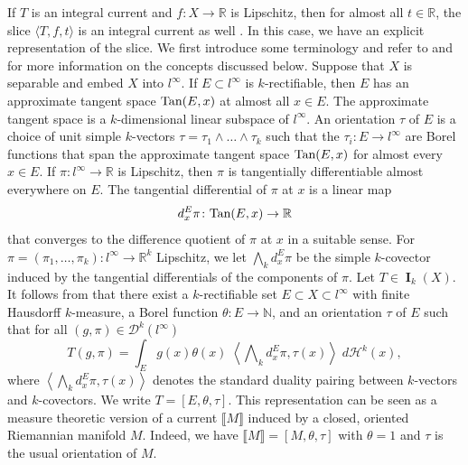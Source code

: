 \documentclass{amsart}
\numberwithin{equation}{section}
\newcommand{\R}{\mathbb{R}}
\newcommand{\N}{\mathbb{N}}
\newcommand{\Ha}{\mathcal{H}}
\newcommand{\on}{\:\mbox{\rule{0.1ex}{1.2ex}\rule{1.1ex}{0.1ex}}\:}
\DeclareMathOperator{\bI}{\mathbf{I}}
\newcommand{\bb}[1]{\llbracket #1\rrbracket}
\begin{document}
        
        
        

        \medskip
        If $T$ is an integral current and $f \colon X \to \R$ is Lipschitz, then for almost all $t \in \R$, the slice $\langle T,f,t\rangle$ is an integral current as well \cite[Theorem 5.7]{ambrosio-kirchheim-2000}. In this case, we have an explicit representation of the slice. We first introduce some terminology and refer to \cite[Section 9]{ambrosio-kirchheim-2000} and \cite{ambrosio-kirchheim-rect} for more information on the concepts discussed below. Suppose that $X$ is separable and embed $X$ into $l^\infty$. If $E \subset l^\infty$ is $k$-rectifiable, then $E$ has an approximate tangent space $\textup{Tan}(E,x)$ at almost all $x\in E$. The approximate tangent space is a $k$-dimensional linear subspace of $l^\infty$. An orientation $\tau$ of $E$ is a choice of unit simple $k$-vectors $\tau=\tau_1\wedge\dots\wedge\tau_k$ such that the $\tau_i \colon E \to l^\infty$ are Borel functions that span the approximate tangent space $\textup{Tan}(E,x)$ for almost every $x\in E$. If $\pi\colon l^\infty\to \R$ is Lipschitz, then $\pi$ is tangentially differentiable almost everywhere on $E$. The tangential differential of $\pi$ at $x$ is a linear map
        $$d_x^E\pi \colon \textup{Tan}(E,x) \to \R$$
        that converges to the difference quotient of $\pi$ at $x$ in a suitable sense. For $\pi = (\pi_1,\dots,\pi_k) \colon l^\infty\to \R^k$ Lipschitz, we let $\bigwedge_kd_x^E \pi$ be the simple $k$-covector induced by the tangential differentials of the components of $\pi$. Let $T\in \bI_k(X)$. It follows from \cite[Theorem 9.1]{ambrosio-kirchheim-2000} that there exist a $k$-rectifiable set $E \subset X\subset l^\infty$ with finite Hausdorff $k$-measure, a Borel function $\theta\colon E \to \N$, and an orientation $\tau$ of $E$ such that for all $(g,\pi) \in \mathcal{D}^{k}(l^\infty)$
        $$T(g,\pi) = \int_E g(x) \theta(x) \; \left\langle \bigwedge\nolimits_{k} d^E_x \pi, \tau(x)\right\rangle \; d\Ha^k(x),$$
        where $\left\langle \bigwedge\nolimits_{k} d^E_x \pi, \tau(x)\right\rangle$ denotes the standard duality pairing between $k$-vectors and $k$-covectors. We write $T= [E,\theta,\tau]$. This representation can be seen as a measure theoretic version of a current $\bb{M}$ induced by a closed, oriented Riemannian manifold $M$. Indeed, we have $\bb{M}= [M,\theta,\tau]$ with $\theta = 1$ and $\tau$ is the usual orientation of $M$. 
\end{document}
